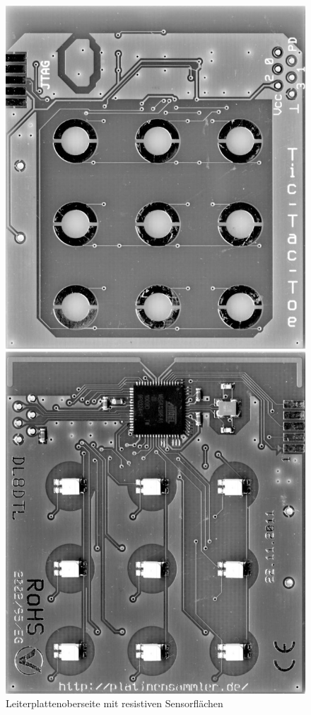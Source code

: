 \documentclass{clt2012}
\begin{document}
\begin{figure}
\begin{minipage}[hbt]{0.45\linewidth}
	\centering
	\includegraphics[width=\linewidth]{board_top}
	\caption{Leiterplattenoberseite mit resistiven Sensorflächen}
	\label{fig:board_top}
\end{minipage}
\hfill
\begin{minipage}[hbt]{0.45\linewidth}
	\centering
	\includegraphics[width=\linewidth]{board_solder}

\end{minipage}
\end{figure}
\end{document}
